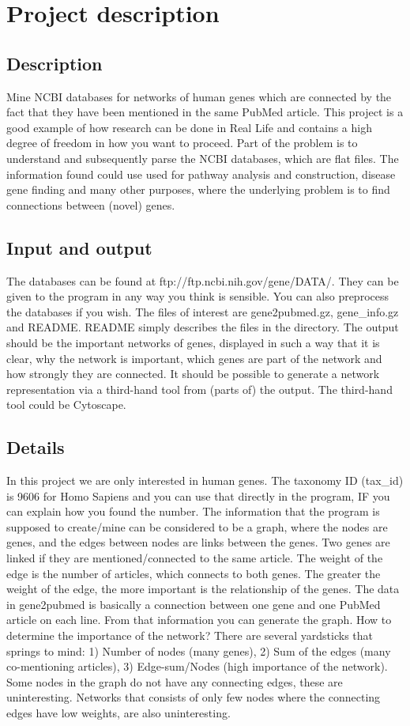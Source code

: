 \section*{Project description}

\subsection*{Description}
Mine NCBI databases for networks of human genes which are connected by the fact that they have been mentioned in the same PubMed article. This project is a good example of how research can be done in Real Life and contains a high degree of freedom in how you want to proceed. Part of the problem is to understand and subsequently parse the NCBI databases, which are flat files. The information found could use used for pathway analysis and construction, disease gene finding and many other purposes, where the underlying problem is to find connections between (novel) genes.

\subsection*{Input and output}
The databases can be found at ftp://ftp.ncbi.nih.gov/gene/DATA/. They can be given to the program in any way you think is sensible. You can also preprocess the databases if you wish. The files of interest are gene2pubmed.gz, gene\_info.gz and README. README simply describes the files in the directory.
The output should be the important networks of genes, displayed in such a way that it is clear, why the network is important, which genes are part of the network and how strongly they are connected. It should be possible to generate a network representation via a third-hand tool from (parts of) the output. The third-hand tool could be Cytoscape.

\subsection*{Details}
In this project we are only interested in human genes. The taxonomy ID (tax\_id) is 9606 for Homo Sapiens and you can use that directly in the program, IF you can explain how you found the number.
The information that the program is supposed to create/mine can be considered to be a graph, where the nodes are genes, and the edges between nodes are links between the genes. Two genes are linked if they are mentioned/connected to the same article. The weight of the edge is the number of articles, which connects to both genes. The greater the weight of the edge, the more important is the relationship of the genes. The data in gene2pubmed is basically a connection between one gene and one PubMed article on each line. From that information you can generate the graph.
How to determine the importance of the network? There are several yardsticks that springs to mind: 1) Number of nodes (many genes), 2) Sum of the edges (many co-mentioning articles), 3) Edge-sum/Nodes (high importance of the network).
Some nodes in the graph do not have any connecting edges, these are uninteresting. Networks that consists of only few nodes where the connecting edges have low weights, are also uninteresting.